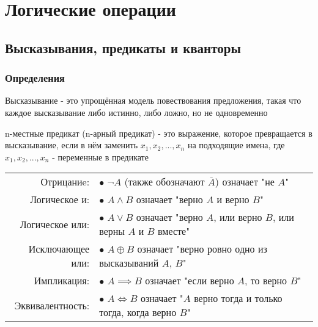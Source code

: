 \chapter{Логические операции}


\section{Высказывания, предикаты и кванторы}

\subsection{Определения}

{
    Высказывание - это упрощённая модель повествования предложения,
    такая что каждое высказывание либо истинно, либо ложно, но не одновременно

    n-местные предикат (n-арный предикат) - это выражение, которое превращается в
    высказывание, если в нём заменить $ x_1, x_2, ..., x_n $ на подходящие имена, где
    $ x_1, x_2, ..., x_n $ - переменные в предикате
}

{
\begin{tabular}{rl}
    Отрицаниe:       & $\bullet$ $ \lnot A $ (также обозначают $ \overline{A} $) означает "не $A$" \\
    Логическое и:    & $\bullet$ $ A \wedge B $ означает "верно $A$ и верно $B$" \\
    Логическое или:  & $\bullet$ $ A \vee B $ означает "верно $A$, или верно $B$, или верны $A$ и $B$ вместе" \\
    Исключающее или: & $\bullet$ $ A \oplus B $ означает "верно ровно одно из высказываний $A$, $B$" \\
    Импликация:      & $\bullet$ $ A \implies B $ означает "если верно $A$, то верно $B$" \\
    Эквивалентность: & $\bullet$ $ A \iff B $ означает "$A$ верно тогда и только тогда, когда верно $B$" \\
\end{tabular}
}


